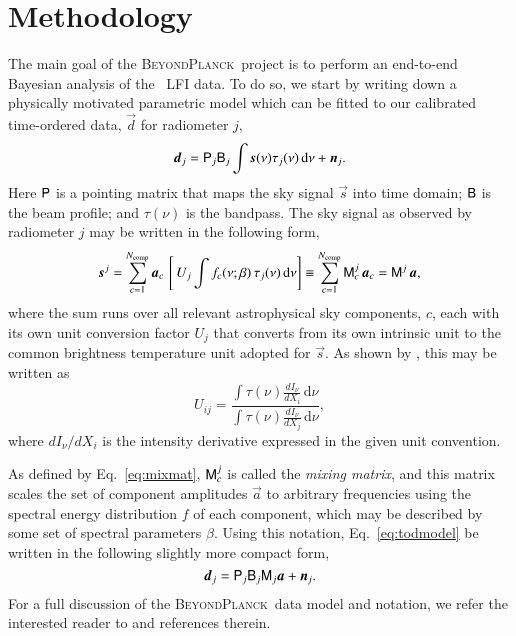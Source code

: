 \documentclass[twocolumn]{aa}
\renewcommand{\d}[0]{\vec{d}}
\newcommand{\n}[0]{\vec{n}}
\newcommand{\s}[0]{\vec{s}}
\renewcommand{\a}[0]{\vec{a}}
\newcommand{\B}[0]{\tens{B}}
\newcommand{\M}[0]{\tens{M}}
\renewcommand{\P}[0]{\tens{P}}
\newcommand{\BP}{\textsc{BeyondPlanck}}
\newcommand{\?}[1]{\textcolor{red}{{\bf [#1]}}}
\begin{document}
\section{Methodology}
\label{sec:methods}

The main goal of the \BP\ project is to perform an end-to-end Bayesian analysis
of the \Planck\ LFI data. To do so, we start by writing down a physically
motivated parametric model which can be fitted to our calibrated time-ordered
data, $\d$ for radiometer $j$,
\begin{equation}
  \d_j = \P_j\B_j\int \s(\nu)\tau_j(\nu)\,\mathrm d\nu + \n_j.
  \label{eq:todmodel}
\end{equation}
Here $\P$ is a pointing matrix that maps the sky signal $\s$ into time
domain; $\B$ is the beam profile; and $\tau(\nu)$ is the bandpass. The
sky signal as observed by radiometer $j$ may be written in the
following form,
\begin{equation}
  \s^j = \sum_{c=1}^{N_{\mathrm{comp}}}\a_c\, \left[\,U_j \int f_c(\nu; \beta)\,
    \tau_j(\nu)\,\mathrm d\nu\right] \equiv
  \sum_{c=1}^{N_{\mathrm{comp}}}\M^j_c\,\a_c = \M^j\,\a,
  \label{eq:mixmat}
\end{equation}
where the sum runs over all relevant astrophysical sky components,
$c$, each with its own unit conversion factor $U_j$ that converts from its own intrinsic unit to the common brightness temperature unit adopted for $\s$. As shown by \citep{planck2013-p03d}, this may be written as
\begin{equation}
U_{ij} = \frac{\int \tau(\nu)\frac{dI_{\nu}}{dX_i}\, \mathrm d\nu}{\int
  \tau(\nu)\frac{dI_{\nu}}{dX_j}\,\mathrm d\nu},
\end{equation}
where $dI_{\nu}/dX_i$ is the intensity derivative expressed in the given unit convention.

As defined by Eq.~\eqref{eq:mixmat}, $\M_c^j$ is called the \emph{mixing
  matrix}, and this matrix scales the set of component amplitudes $\a$ to
arbitrary frequencies using the spectral energy distribution $f$ of each component,
which may be described by some set of spectral parameters
$\beta$. Using this notation, Eq.~\eqref{eq:todmodel} be written in
the following slightly more compact form,
\begin{equation}
  \d_j = \P_j\B_j\M_j\a + \n_j.
  \label{eq:todmodelmat}
\end{equation}
For a full discussion of the \BP\ data model and notation, we
refer the interested reader to \citet{bp01} and references therein.
\end{document}
